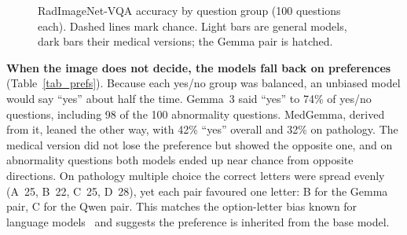 \documentclass[doublecolumn]{ijcvsplatex}
\newcommand{\gemma}{Gemma~3}
\newcommand{\medgemma}{MedGemma}
\begin{document}
\begin{figure}[tb]
\centering
{}
\caption{RadImageNet-VQA accuracy by question group (100 questions each). Dashed lines mark chance. Light bars are general models, dark bars their medical versions; the Gemma pair is hatched.}
\label{fig_radimagenet}
\end{figure}

\textbf{When the image does not decide, the models fall back on preferences} (Table~\ref{tab_prefs}). Because each yes/no group was balanced, an unbiased model would say ``yes'' about half the time. \gemma{} said ``yes'' to 74\% of yes/no questions, including 98 of the 100 abnormality questions. \medgemma{}, derived from it, leaned the other way, with 42\% ``yes'' overall and 32\% on pathology. The medical version did not lose the preference but showed the opposite one, and on abnormality questions both models ended up near chance from opposite directions. On pathology multiple choice the correct letters were spread evenly (A~25, B~22, C~25, D~28), yet each pair favoured one letter: B for the Gemma pair, C for the Qwen pair. This matches the option-letter bias known for language models~\cite{zheng2024mcqbias} and suggests the preference is inherited from the base model.
\end{document}
